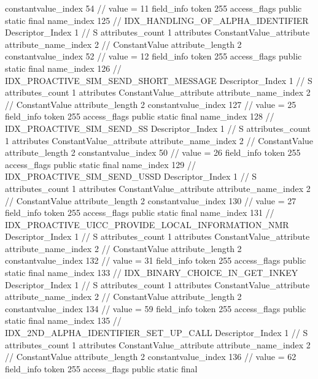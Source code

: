 {{{{{{{					constantvalue_index	54		// value = 11
				}
				}
			}
			field_info {
				token	255
				access_flags	public static final
				name_index	125		// IDX_HANDLING_OF_ALPHA_IDENTIFIER
				Descriptor_Index	1		// S
				attributes_count	1
				attributes {
				ConstantValue_attribute {
					attribute_name_index	2		// ConstantValue
					attribute_length	2
					constantvalue_index	52		// value = 12
				}
				}
			}
			field_info {
				token	255
				access_flags	public static final
				name_index	126		// IDX_PROACTIVE_SIM_SEND_SHORT_MESSAGE
				Descriptor_Index	1		// S
				attributes_count	1
				attributes {
				ConstantValue_attribute {
					attribute_name_index	2		// ConstantValue
					attribute_length	2
					constantvalue_index	127		// value = 25
				}
				}
			}
			field_info {
				token	255
				access_flags	public static final
				name_index	128		// IDX_PROACTIVE_SIM_SEND_SS
				Descriptor_Index	1		// S
				attributes_count	1
				attributes {
				ConstantValue_attribute {
					attribute_name_index	2		// ConstantValue
					attribute_length	2
					constantvalue_index	50		// value = 26
				}
				}
			}
			field_info {
				token	255
				access_flags	public static final
				name_index	129		// IDX_PROACTIVE_SIM_SEND_USSD
				Descriptor_Index	1		// S
				attributes_count	1
				attributes {
				ConstantValue_attribute {
					attribute_name_index	2		// ConstantValue
					attribute_length	2
					constantvalue_index	130		// value = 27
				}
				}
			}
			field_info {
				token	255
				access_flags	public static final
				name_index	131		// IDX_PROACTIVE_UICC_PROVIDE_LOCAL_INFORMATION_NMR
				Descriptor_Index	1		// S
				attributes_count	1
				attributes {
				ConstantValue_attribute {
					attribute_name_index	2		// ConstantValue
					attribute_length	2
					constantvalue_index	132		// value = 31
				}
				}
			}
			field_info {
				token	255
				access_flags	public static final
				name_index	133		// IDX_BINARY_CHOICE_IN_GET_INKEY
				Descriptor_Index	1		// S
				attributes_count	1
				attributes {
				ConstantValue_attribute {
					attribute_name_index	2		// ConstantValue
					attribute_length	2
					constantvalue_index	134		// value = 59
				}
				}
			}
			field_info {
				token	255
				access_flags	public static final
				name_index	135		// IDX_2ND_ALPHA_IDENTIFIER_SET_UP_CALL
				Descriptor_Index	1		// S
				attributes_count	1
				attributes {
				ConstantValue_attribute {
					attribute_name_index	2		// ConstantValue
					attribute_length	2
					constantvalue_index	136		// value = 62
				}
				}
			}
			field_info {
				token	255
				access_flags	public static final
}}}}}
